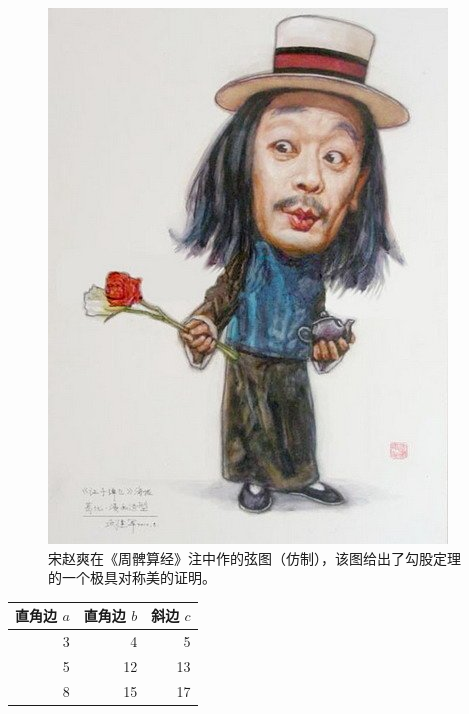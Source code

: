 \documentclass[UTF8]{ctexart}
\begin{document}
\begin{figure}[ht]
    \centering
    \includegraphics[scale=0.6]{ma_bang_de.jpg}
    \caption{宋赵爽在《周髀算经》注中作的弦图（仿制），该图给出了勾股定理的一个极具对称美的证明。}
    \label{fig:ma_bang_de}

\end{figure}

\begin{tabular}{|rrr|}
    \hline
    直角边 $a$ & 直角边 $b$ & 斜边 $c$ \\
    \hline
    3       & 4       & 5      \\
    5       & 12      & 13     \\
    8       & 15      & 17     \\
    \hline
\end{tabular}
\end{document}
